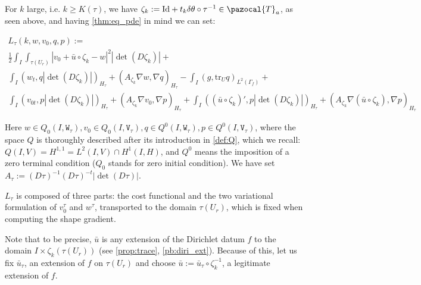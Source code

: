 \documentclass[english,a4paper,10pt,oneside]{scrbook}	%
\theoremstyle{break}
\theoremstyle{remark}
\newcommand{\tr}{\text{tr}}
\newcommand{\cT}{\pazocal{T}}
\newcommand{\id}{\text{Id}}
\newcommand{\te}{\theta}
\newcommand{\tw}[1]{\texttt{#1}}
\begin{document}
For $k$ large, i.e. $k\geq K(\tau)$, we have $\zeta_k:=\id+t_k \delta\te \circ \tau^{-1} \in \cT_a$, as seen above, and  having \cref{thm:eq_pde} in mind we can set:

\begin{align*}
L_\tau(k,w,v_0,q,p) := \\
\frac{1}{2}\int_I \int_{\tau(U_r)}|v_0+\bar{u} \circ \zeta_k - w|^2|\det(D\zeta_k)|+\\
\int_I ( w_t , q |\det(D\zeta_k)|)_{H_\tau}+ (A_{\zeta_k}\nabla w, \nabla q)_{H_\tau} -\int_I(g,\tr_{U} q)_{L^2(\Gamma_f)} +\\ \int_I (v_{0t},p |\det(D\zeta_k)|)_{H_\tau} + (A_{\zeta_k} \nabla v_0, \nabla p)_{H_\tau}+\int_I((\bar{u}\circ \zeta_k)',p|\det(D\zeta_k)|)_{H_\tau}+(A_{\zeta_k} \nabla (\bar{u} \circ \zeta_k), \nabla p)_{H_\tau}
\end{align*}

Here $w \in Q_0(I, \tw{W}_\tau), v_0 \in Q_0(I,\tw{V}_\tau), q \in Q^0(I, \tw{W}_\tau), p \in Q^0(I, \tw{V}_\tau)$, where the space $Q$ is thoroughly described after its introduction in \cref{def:Q}, which we recall: $Q(I,V)=H^{1,1}=L^2(I,V)\cap H^1(I,H)$, and $Q^0$ means the imposition of a zero terminal condition ($Q_0$ stands for zero initial condition). We have set $A_\tau:=  (D\tau)^{-1}(D\tau)^{-t}|\det(D\tau)|$.

$L_\tau$ is composed of three parts: the cost functional and the two variational formulation of $v_0^\tau$ and $w^\tau$, transported to the domain $\tau(U_r)$, which is fixed when computing the shape gradient.

Note that to be precise, $\bar{u}$ is any extension of the Dirichlet datum $f$ to the domain $I \times \zeta_k(\tau(U_r))$ (see \cref{prop:trace}, \cref{pb:diri_ext}). Because of this, let us fix $\bar{u}_\tau$, an extension of $f$ on $\tau(U_r)$ and choose $\bar{u}:=\bar{u}_\tau\circ \zeta_k^{-1}$, a legitimate extension of $f$.


\end{document}
